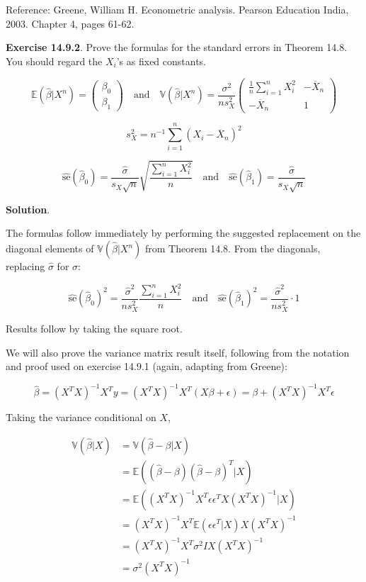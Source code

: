 Reference: Greene, William H. Econometric analysis. Pearson Education
India, 2003. Chapter 4, pages 61-62.

\textbf{Exercise 14.9.2}. Prove the formulas for the standard errors in
Theorem 14.8. You should regard the \(X_i\)'s as fixed constants.

\[
\mathbb{E}(\hat{\beta} | X^n) = \begin{pmatrix}\beta_0 \\ \beta_1 \end{pmatrix}
\quad \text{and} \quad
\mathbb{V}(\hat{\beta} | X^n) = \frac{\sigma^2}{n s_X^2} \begin{pmatrix} 
\frac{1}{n} \sum_{i=1}^n X_i^2 & -\overline{X}_n \\
-\overline{X}_n & 1
\end{pmatrix}
\]

\[s_X^2 = n^{-1} \sum_{i=1}^n (X_i - \overline{X}_n)^2\]

\[
\hat{\text{se}}(\hat{\beta}_0) = \frac{\hat{\sigma}}{s_X \sqrt{n}} \sqrt{\frac{\sum_{i=1}^n X_i^2}{n}}
\quad \text{and} \quad
\hat{\text{se}}(\hat{\beta}_1) = \frac{\hat{\sigma}}{s_X \sqrt{n}}
\]

\textbf{Solution}.

The formulas follow immediately by performing the suggested replacement
on the diagonal elements of \(\mathbb{V}(\hat{\beta} | X^n)\) from
Theorem 14.8. From the diagonals, replacing \(\hat{\sigma}\) for
\(\sigma\):

\[
\hat{\text{se}}(\hat{\beta}_0)^2 = \frac{\hat{\sigma}^2}{n s_X^2} \frac{\sum_{i=1}^n X_i^2}{n}
\quad \text{and} \quad
\hat{\text{se}}(\hat{\beta}_1)^2 = \frac{\hat{\sigma}^2}{n s_X^2} \cdot 1\]

Results follow by taking the square root.

We will also prove the variance matrix result itself, following from the
notation and proof used on exercise 14.9.1 (again, adapting from
Greene):

\[
\hat{\beta} = (X^T X)^{-1}X^T y = (X^T X)^{-1}X^T (X \beta + \epsilon) = \beta + (X^T X)^{-1}X^T \epsilon
\]

Taking the variance conditional on \(X\),

\begin{align}
\mathbb{V}(\hat{\beta} | X) &= \mathbb{V}(\hat{\beta} - \beta | X) \\
&= \mathbb{E}((\hat{\beta} - \beta)(\hat{\beta} - \beta)^T | X)  \\
&= \mathbb{E}((X^T X)^{-1}X^T \epsilon\epsilon^T X(X^T X)^{-1} | X) \\
&= (X^T X)^{-1}X^T \mathbb{E}(\epsilon\epsilon^T | X) X(X^T X)^{-1} \\
&= (X^T X)^{-1}X^T \sigma^2 I X(X^T X)^{-1} \\
&= \sigma^2 (X^T X)^{-1} 
\end{align}

